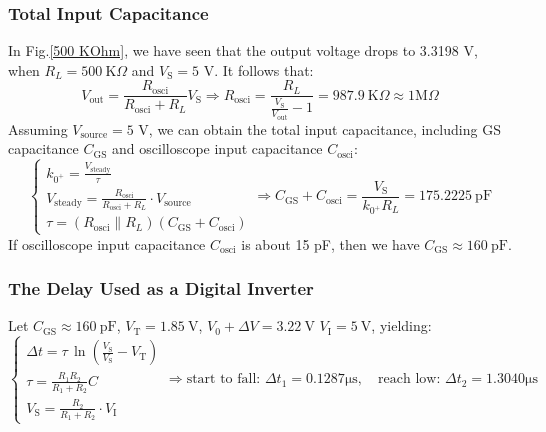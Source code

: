 \documentclass[UTF8]{article}
\def\KO{\ \mathrm{K}\Omega}
\def\pF{\ \mathrm{pF}}
\def\KO{\ \mathrm{K}\Omega}
\theoremstyle{MyLineTheoremStyle} %
\theoremstyle{MyBlockTheoremStyle} %
\theoremstyle{MySubsubsectionStyle} %
\begin{document}
\subsubsection{Total Input Capacitance}
In Fig.\ref{500 KOhm}, we have seen that the output voltage drops to 3.3198 V, when $R_L = 500 \KO$ and $V_\text{S} = 5$ V. It follows that:
\begin{equation}
V_\text{out} = \frac{R_{\text{osci}}}{R_{\text{osci}} + R_L}V_\text{S} \Longrightarrow R_{\text{osci}} = \frac{R_L}{\frac{V_\text{S}}{V_\text{out}} - 1} = 987.9 \KO \approx 1 \mathrm{M}\Omega
\end{equation}
Assuming $V_\text{source} = 5$ V, we can obtain the total input capacitance, including GS capacitance $C_{\text{GS}}$ and oscilloscope input capacitance $C_{\text{osci}}$:
\begin{equation}
    \begin{cases}
        k_{0^+} = \frac{V_\text{steady}}{\tau}\\
        V_\text{steady} = \frac{R_{\text{osci}}}{R_{\text{osci}} + R_L}\cdot V_\text{source}\\
        \tau = \left( R_{\text{osci}} \parallel R_L \right) \left(C_{\text{GS}} + C_{\text{osci}} \right)
    \end{cases}
    \Longrightarrow 
    C_{\text{GS}} + C_{\text{osci}}= \frac{V_\text{S}}{k_{0^+}R_L} = 175.2225 \pF
\end{equation}
If oscilloscope input capacitance $C_{\text{osci}}$ is about 15 pF, then we have $C_{\text{GS}} \approx 160 \pF$.

\subsubsection{The Delay Used as a Digital Inverter} 
Let $C_{\text{GS}} \approx 160 \pF$, $V_\text{T} = 1.85 \ \mathrm{V}$, $V_0 + \Delta V = 3.22 \ \mathrm{V}$ $V_\text{I} = 5 \ \mathrm{V}$,  yielding:
\begin{equation}
    \begin{cases}
        \Delta t = \tau \,\ln \left(\frac{V_\text{S}}{V_\text{S}} - V_\text{T}\right) \\ 
        \tau = \frac{R_1 R_2}{R_1 + R_2} C \\ 
        V_\text{S} = \frac{R_2}{R_1 + R_2} \cdot V_\text{I}
    \end{cases}\Longrightarrow 
\text{start to fall:\ } \Delta t_1 = 0.1287 \mathrm{\mu s},\quad \text{reach low:\ } \Delta t_2 = 1.3040  \mathrm{\mu s}
\end{equation}

\captionsetup[figure]{name=图}  
\captionsetup[table]{name=表}
\end{document}
